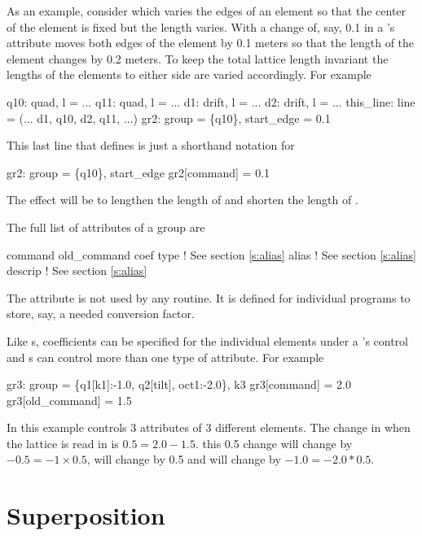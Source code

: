 As an example, consider  which varies the edges of
an element so that the center of the element is fixed but the length
varies. With  a change of, say, 0.1 in a
's  attribute moves both edges of the element by
0.1 meters so that the length of the element changes by 0.2 meters. To
keep the total lattice length invariant the lengths of the elements to
either side are varied accordingly. For example
\begin{example}
  q10: quad, l = ...
  q11: quad, l = ...
  d1: drift, l = ...
  d2: drift, l = ...
  this_line: line = (... d1, q10, d2, q11, ...)
  gr2: group = \{q10\}, start_edge = 0.1
\end{example}
This last line that defines  is just a shorthand notation for
\begin{example}
  gr2: group = \{q10\}, start_edge 
  gr2[command] = 0.1
\end{example}
The effect will be to lengthen the length of  and shorten the
length of .

The full list of attributes of a group are
\begin{example}
  command         
  old_command     
  coef            
  type            ! See section \ref{s:alias}
  alias           ! See section \ref{s:alias}
  descrip         ! See section \ref{s:alias}
\end{example}
The  attribute is not used by any \bmad routine. It is
defined for individual programs to store, say, a needed conversion
factor.

Like s, coefficients can be specified for the individual
elements under a 's control and s can control more
than one type of attribute. For example
\begin{example}
  gr3: group = \{q1[k1]:-1.0, q2[tilt], oct1:-2.0\}, k3
  gr3[command] = 2.0
  gr3[old_command] = 1.5
\end{example}
In this example  controls 3 attributes of 3 different
elements. The change in  when the lattice is read in is $0.5
= 2.0 - 1.5$. this 0.5 change will change  by $-0.5 = -1
\times 0.5$,  will change by 0.5 and  will
change by $-1.0 = -2.0 * 0.5$.

\section{Superposition}
\label{s:super}

